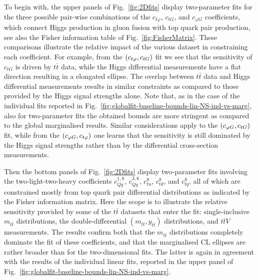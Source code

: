 To begin with, the upper panels of Fig.~\ref{fig:2Dfits} display two-parameter fits
for the three possible pair-wise combinations of the $c_{t \varphi}$, $c_{tG}$, and $c_{\varphi G}$
coefficients,
which connect Higgs production in gluon fusion with top quark pair production, see also
the Fisher information table of  Fig.~\ref{fig:FisherMatrix}.
%
These comparisons illustrate the relative impact of the various dataset in constraining
each coefficient.
%
For example, from the $\lp c_{t\varphi},c_{tG}\rp$ fit we see that the sensitivity of
$c_{tG}$ is driven by $t\bar{t}$ data, while the Higgs differential
measurements have a flat direction
resulting in a elongated ellipse.
%
The overlap between $t\bar{t}$ data and  Higgs differential
measurements results in similar constraints as compared to those
provided by the Higgs signal strengths alone.
%
Note that, as in the case of the individual fits reported in
Fig.~\ref{fig:globalfit-baseline-bounds-lin-NS-ind-vs-marg}, also for two-parameter fits
the obtained bounds are more stringent as compared to the global marginalised results.
%
Similar considerations apply to the $\lp c_{\varphi G},c_{tG}\rp$ fit, while
from the $\lp c_{\varphi G},c_{t\varphi}\rp$ one learns that the sensitivity
is still dominated by the Higgs signal strengths rather than by the differential cross-section
measurements.

Then the bottom panels of Fig.~\ref{fig:2Dfits} display two-parameter fits involving the
two-light-two-heavy coefficients $c_{Qq}^{1,8}$, $c_{Qq}^{3,8}$, $c_{tu}^8$, $c_{td}^8$, and $c_{tq}^8$,
all of which are constrained mostly from top quark pair differential distributions as indicated
by the Fisher information matrix.
%
Here the scope is to illustrate the relative sensitivity provided by some of the $t\bar{t}$
datasets that enter the fit: single-inclusive $m_{t\bar{t}}$ distributions, the double-differential
$(m_{t\bar{t}},y_{t\bar{t}})$ distributions, and $t\bar{t}V$ measurements.
%
The results confirm both that the $m_{t\bar{t}}$ distributions completely dominate
the fit of these coefficients, and that the marginalised CL ellipses are rather broader
than for the two-dimensional fits.
%
The latter is again in agreement with the results of the individual
linear fits, reported in the upper panel of
Fig.~\ref{fig:globalfit-baseline-bounds-lin-NS-ind-vs-marg}.


